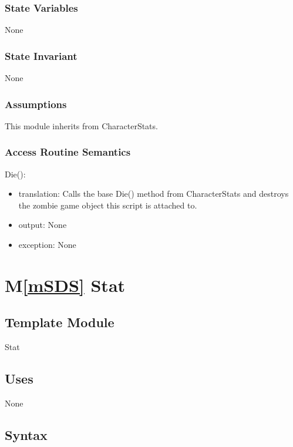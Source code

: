 \documentclass[12pt]{article}
\newcommand{\mref}[1]{M\ref{#1}}
\begin{document}
\subsubsection* {State Variables}

None

\subsubsection* {State Invariant}

None

\subsubsection* {Assumptions}

This module inherits from CharacterStats.

\subsubsection* {Access Routine Semantics}

\noindent Die():
\begin{itemize}
\item translation: Calls the base Die() method from CharacterStats and destroys the zombie game object this script is attached to.
\item output: None
\item exception: None
\end{itemize}

\newpage

\section* {\mref{mSDS} Stat}

\subsection*{Template Module}

Stat

\subsection* {Uses}

None

\subsection* {Syntax}
\end{document}
